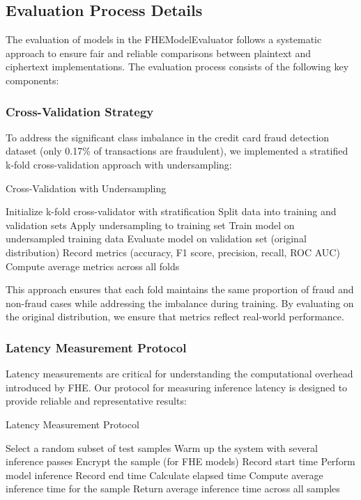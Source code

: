 \documentclass[a4paper,12pt]{article}
\begin{document}
\subsection{Evaluation Process Details}
The evaluation of models in the FHEModelEvaluator follows a systematic approach to ensure fair and reliable comparisons between plaintext and ciphertext implementations. The evaluation process consists of the following key components:

\subsubsection{Cross-Validation Strategy}
To address the significant class imbalance in the credit card fraud detection dataset (only 0.17\% of transactions are fraudulent), we implemented a stratified k-fold cross-validation approach with undersampling:

\begin{algorithm}
\caption{Cross-Validation with Undersampling}
\begin{algorithmic}[1]
\STATE Initialize k-fold cross-validator with stratification
    \STATE Split data into training and validation sets
    \STATE Apply undersampling to training set
    \STATE Train model on undersampled training data
    \STATE Evaluate model on validation set (original distribution)
    \STATE Record metrics (accuracy, F1 score, precision, recall, ROC AUC)
\ENDFOR
\STATE Compute average metrics across all folds
\end{algorithmic}
\end{algorithm}

This approach ensures that each fold maintains the same proportion of fraud and non-fraud cases while addressing the imbalance during training. By evaluating on the original distribution, we ensure that metrics reflect real-world performance.

\subsubsection{Latency Measurement Protocol}
Latency measurements are critical for understanding the computational overhead introduced by FHE. Our protocol for measuring inference latency is designed to provide reliable and representative results:

\begin{algorithm}
\caption{Latency Measurement Protocol}
\begin{algorithmic}[1]
\STATE Select a random subset of test samples
\STATE Warm up the system with several inference passes
    \STATE Encrypt the sample (for FHE models)
        \STATE Record start time
        \STATE Perform model inference
        \STATE Record end time
        \STATE Calculate elapsed time
    \ENDFOR
    \STATE Compute average inference time for the sample
\ENDFOR
\STATE Return average inference time across all samples
\end{algorithmic}
\end{algorithm}
\end{document}
